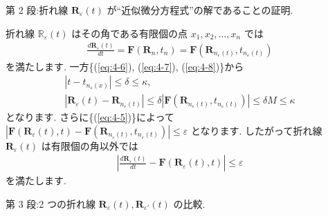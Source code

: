 \documentclass[openany, a4paper, oneside]{jsbook}
\theoremstyle{break}
\theoremstyle{breakdefn}
\newcommand{\abs}[1]{\left|#1\right|}
\newcommand{\bbR}{\mathbb{R}}
\newcommand{\vep}{\varepsilon}
\begin{document}
第 2 段:折れ線 $\bm{R}_{\vep} (t)$ が``近似微分方程式''の解であることの証明.

折れ線 $\bbR_{\vep}(t)$ はその角である有限個の点 $x_1, x_2 ,\dots,x_n$ では
\begin{gather}
\frac{d \bm{R}_{\vep} ( t ) } {dt}
=
\bm{F} ( \bm{R}_n , t_n )
=
\bm{F} ( \bm{R}_{ n_{\vep} ( t ) } , t_{ n_{\vep} (t) } )
\end{gather}
を満たします.
一方\{(\ref{eq:4-6}), (\ref{eq:4-7}), (\ref{eq:4-8})\}から
\begin{gather}
\abs{t - t_{n_{\vep} (x)}}
\leq
\delta
\leq
\kappa
, \\
\abs{\bm{R}_{\vep} (t) - \bm{R}_{ n_{\vep} (t) }}
\leq
\delta | \bm{F} ( \bm{R}_{ n_{\vep} (t) } , t_{ n_{\vep} (t) } ) |
\leq
\delta M
\leq
\kappa
\end{gather}
となります.
さらに\{(\ref{eq:4-5})\}によって
$| \bm{F} ( \bm{R}_{\vep} (t) , t ) - \bm{F} ( \bm{R}_{ n_{\vep} ( t ) } , t_{ n_{\vep} (t) } ) | \leq \vep$
となります.
したがって折れ線 $\bm{R}_{\vep} (t)$ は有限個の角以外では
\begin{gather}
\left | \frac{ d \bm{R}_{\vep} ( t ) } {dt} - \bm{F} ( \bm{R}_{\vep} (t) , t )  \right|
\leq
\vep
\label{eq:4-9}
\end{gather}
を満たします.

第 3 段:2 つの折れ線 $\bm{R}_{\vep}(t),\bm{R}_{\vep '}(t)$ の比較.
\end{document}

